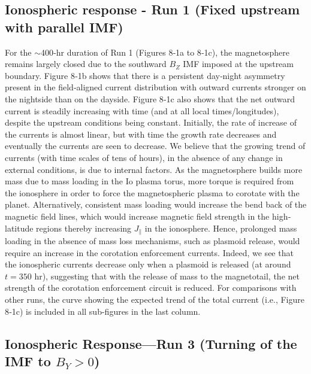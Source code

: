\subsection{Ionospheric response - Run 1 (Fixed upstream with parallel IMF)}

For the $\sim$400‐hr duration of Run 1 (Figures 8‐1a to 8‐1c), the magnetosphere remains largely closed due to the southward $B_Z$ IMF imposed at the upstream boundary. Figure 8‐1b shows that there is a persistent day‐night asymmetry present in the field‐aligned current distribution with outward currents stronger on the nightside than on the dayside. Figure 8‐1c also shows that the net outward current is steadily increasing with time (and at all local times/longitudes), despite the upstream conditions being constant. Initially, the rate of increase of the currents is almost linear, but with time the growth rate decreases and eventually the currents are seen to decrease. We believe that the growing trend of currents (with time scales of tens of hours), in the absence of any change in external conditions, is due to internal factors. As the magnetosphere builds more mass due to mass loading in the Io plasma torus, more torque is required from the ionosphere in order to force the magnetospheric plasma to corotate with the planet. Alternatively, consistent mass loading would increase the bend back of the magnetic field lines, which would increase magnetic field strength in the high‐latitude regions thereby increasing $J_\parallel$ in the ionosphere. Hence, prolonged mass loading in the absence of mass loss mechanisms, such as plasmoid release, would require an increase in the corotation enforcement currents. Indeed, we see that the ionospheric currents decrease only when a plasmoid is released (at around $t = 350$ hr), suggesting that with the release of mass to the magnetotail, the net strength of the corotation enforcement circuit is reduced. For comparisons with other runs, the curve showing the expected trend of the total current (i.e., Figure 8‐1c) is included in all sub-figures in the last column. 

\subsection{Ionospheric Response—Run 3 (Turning of the IMF to \texorpdfstring{$B_Y > 0$}{By>0}) }

